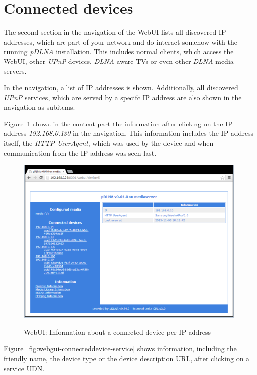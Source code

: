 \documentclass[a4paper,oneside,10pt]{report}
\begin{document}
\section{Connected devices}

The second section in the navigation of the WebUI lists all discovered IP addresses, which are part of your network and do interact somehow with the running {\em pDLNA} installation. This includes normal clients, which access the WebUI, other {\em UPnP} devices, {\em DLNA} aware TVs or even other {\em DLNA} media servers.

In the navigation, a list of IP addresses is shown. Additionally, all discovered {\em UPnP} services, which are served by a specifc IP address are also shown in the navigation as subitems.

Figure~\ref{fig:webgui-connecteddevice-ip} shows in the content part the information after clicking on the IP address {\em 192.168.0.130} in the navigation. This information includes the IP address itself, the {\em HTTP UserAgent}, which was used by the device and when communication from the IP address was seen last.

\begin{figure}
	\centering
		\includegraphics[width=34em]{images/webui_device_ip}
	\label{fig:webgui-connecteddevice-ip}
	\caption{WebUI: Information about a connected device per IP address}
\end{figure}

Figure~\ref{fig:webgui-connecteddevice-service} shows information, including the friendly name, the device type or the device description URL, after clicking on a service UDN.
\end{document}
